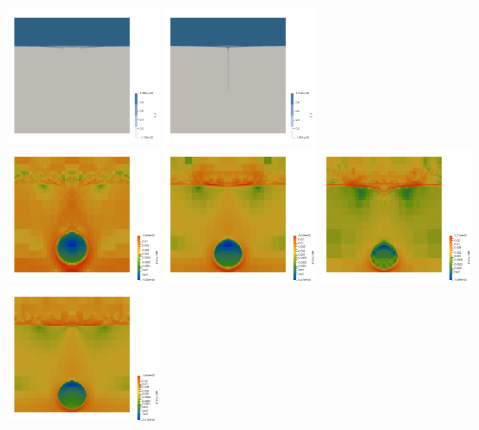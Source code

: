 \begin{center}
\includegraphics[width=4cm]{images/stokes_sphere_fs2D/aspects/C2_h}
\includegraphics[width=4cm]{images/stokes_sphere_fs2D/aspects/C2_m}\\
\includegraphics[width=4cm]{images/stokes_sphere_fs2D/aspects/sr_a}
\includegraphics[width=4cm]{images/stokes_sphere_fs2D/aspects/sr_g}
\includegraphics[width=4cm]{images/stokes_sphere_fs2D/aspects/sr_h}
\includegraphics[width=4cm]{images/stokes_sphere_fs2D/aspects/sr_m}\\

\end{center}
